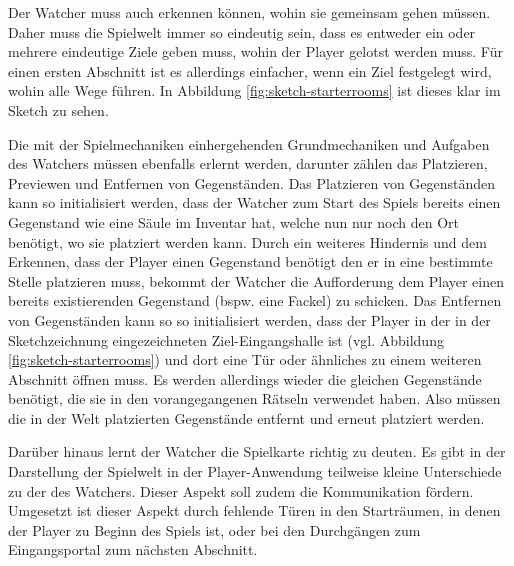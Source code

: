 Der Watcher muss auch erkennen können, wohin sie gemeinsam gehen müssen. Daher muss die Spielwelt immer so eindeutig sein, dass es entweder ein oder mehrere eindeutige Ziele geben muss, wohin der Player gelotst werden muss. Für einen ersten Abschnitt ist es allerdings einfacher, wenn ein Ziel festgelegt wird, wohin alle Wege führen. In Abbildung \ref{fig:sketch-starterrooms} ist dieses klar im Sketch zu sehen. 

Die mit der Spielmechaniken einhergehenden Grundmechaniken und Aufgaben des Watchers müssen ebenfalls erlernt werden, darunter zählen das Platzieren, Previewen und Entfernen von Gegenständen. Das Platzieren von Gegenständen kann so initialisiert werden, dass der Watcher zum Start des Spiels bereits einen Gegenstand wie eine Säule im Inventar hat, welche nun nur noch den Ort benötigt, wo sie platziert werden kann. Durch ein weiteres Hindernis und dem Erkennen, dass der Player einen Gegenstand benötigt den er in eine bestimmte Stelle platzieren muss, bekommt der Watcher die Aufforderung dem Player einen bereits existierenden Gegenstand (bspw. eine Fackel) zu schicken. Das Entfernen von Gegenständen kann so so initialisiert werden, dass der Player in der in der Sketchzeichnung eingezeichneten Ziel-Eingangshalle ist (vgl. Abbildung \ref{fig:sketch-starterrooms}) und dort eine Tür oder ähnliches zu einem weiteren Abschnitt öffnen muss. Es werden allerdings wieder die gleichen Gegenstände benötigt, die sie in den vorangegangenen Rätseln verwendet haben. Also müssen die in der Welt platzierten Gegenstände entfernt und erneut platziert werden.

Darüber hinaus lernt der Watcher die Spielkarte richtig zu deuten. Es gibt in der Darstellung der Spielwelt in der Player-Anwendung teilweise kleine Unterschiede zu der des Watchers. Dieser Aspekt soll zudem die Kommunikation fördern. Umgesetzt ist dieser Aspekt durch fehlende Türen in den Starträumen, in denen der Player zu Beginn des Spiels ist, oder bei den Durchgängen zum Eingangsportal zum nächsten Abschnitt.


